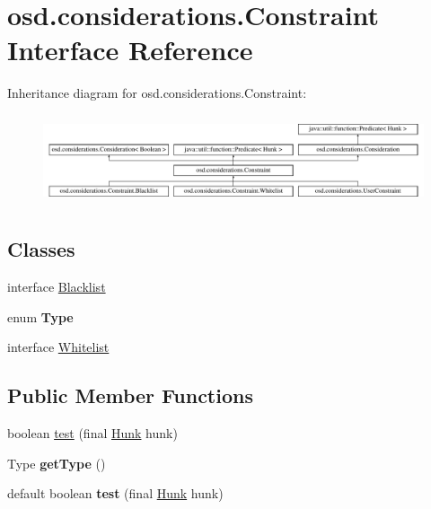 \hypertarget{interfaceosd_1_1considerations_1_1_constraint}{\section{osd.\-considerations.\-Constraint Interface Reference}
\label{interfaceosd_1_1considerations_1_1_constraint}
}
Inheritance diagram for osd.\-considerations.\-Constraint\-:\begin{figure}[H]
\begin{center}
\leavevmode
\includegraphics[height=2.685851cm]{interfaceosd_1_1considerations_1_1_constraint}
\end{center}
\end{figure}
\subsection*{Classes}
\begin{DoxyCompactItemize}
\item 
interface \hyperlink{interfaceosd_1_1considerations_1_1_constraint_1_1_blacklist}{Blacklist}
\item 
enum {\bfseries Type}
\item 
interface \hyperlink{interfaceosd_1_1considerations_1_1_constraint_1_1_whitelist}{Whitelist}
\end{DoxyCompactItemize}
\subsection*{Public Member Functions}
\begin{DoxyCompactItemize}
\item 
boolean \hyperlink{interfaceosd_1_1considerations_1_1_constraint_a50c53a0c89a4cfb8b58deae081ca3787}{test} (final \hyperlink{classosd_1_1output_1_1_hunk}{Hunk} hunk)
\item 
\hypertarget{interfaceosd_1_1considerations_1_1_constraint_ac20b9d39e2b0e9fca84c71603af9ad46}{Type {\bfseries get\-Type} ()}\label{interfaceosd_1_1considerations_1_1_constraint_ac20b9d39e2b0e9fca84c71603af9ad46}

\item 
\hypertarget{interfaceosd_1_1considerations_1_1_constraint_a36bc96efdaadd6f5bcf64198ccf97cd6}{default boolean {\bfseries test} (final \hyperlink{classosd_1_1output_1_1_hunk}{Hunk} hunk)}\label{interfaceosd_1_1considerations_1_1_constraint_a36bc96efdaadd6f5bcf64198ccf97cd6}

\end{DoxyCompactItemize}
